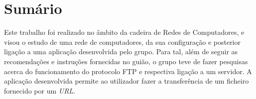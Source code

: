 \documentclass[a4paper, 11pt]{article}
\begin{document}
\maketitle
\thispagestyle{empty}


\newpage

%
%
%
%
%
%
%

\tableofcontents

\newpage

\section{Sumário}
\normalsize 

Este trabalho foi realizado no âmbito da cadeira de Redes de Computadores, e visou o estudo de uma rede de computadores, da sua configuração e posterior ligação a uma aplicação desenvolvida pelo grupo. Para tal, além de seguir as recomendações e instruções fornecidas no guião, o grupo teve de fazer pesquisas acerca do funcionamento do protocolo FTP e respectiva ligação a um servidor. A aplicação desenvolvida permite ao utilizador fazer a transferência de um ficheiro fornecido por um \textit{URL}.
\end{document}
